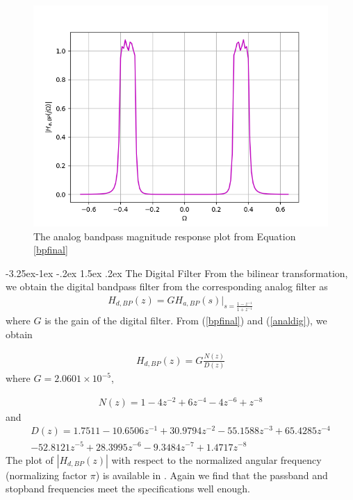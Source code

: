 \documentclass[article]{IEEEtran}
\makeatletter
\theoremstyle{remark}
\numberwithin{equation}{subsection}
\renewcommand\subsection{\@startsection{subsection}{2}{\z@}%
    {-3.25ex\@plus -1ex \@minus -.2ex}%
    {1.5ex \@plus .2ex}%
    {\normalfont\large\bfseries}}
\makeatother
\begin{document}
\begin{figure}[!ht]
\includegraphics[width = \columnwidth]{figs/fig3.png}
\caption{The analog bandpass magnitude response plot from Equation \ref{bpfinal}} 
\label{fig3}
\end{figure}

\subsection{The Digital Filter}
From the bilinear transformation, we obtain the digital bandpass filter from the corresponding analog filter as
\begin{eqnarray}
\label{analdig}
H_{d,BP}(z) = GH_{a,BP}(s)\vert_{s = \frac{1-z^{-1}}{1 + z^{-1}}}
\end{eqnarray}
where $G$ is the gain of the digital filter.  From (\ref{bpfinal}) and (\ref{analdig}), we obtain

\begin{eqnarray}
H_{d,BP}(z) = G \frac{N(z)}{D(z)}
\end{eqnarray}
where $G =  2.0601\times 10^{-5}$,

\begin{eqnarray}
N(z)=  1 - 4 z^{-2} + 6 z^{-4} - 4z^{-6} + z^{-8} 
\end{eqnarray}
and
{\small
\begin{eqnarray}
D(z) = 1.7511  -10.6506z^{-1} + 30.9794z^{-2}  -55.1588z^{-3}+  65.4285z^{-4}\nonumber \\
  -52.8121z^{-5}+   28.3995z^{-6}  -9.3484z^{-7} +   1.4717z^{-8}
\end{eqnarray}
}
The plot of $|H_{d,BP}(z)|$ with respect to the normalized angular frequency (normalizing factor $\pi$) is available in .  Again we
find that the passband and stopband frequencies meet the specifications well enough.
\end{document}
